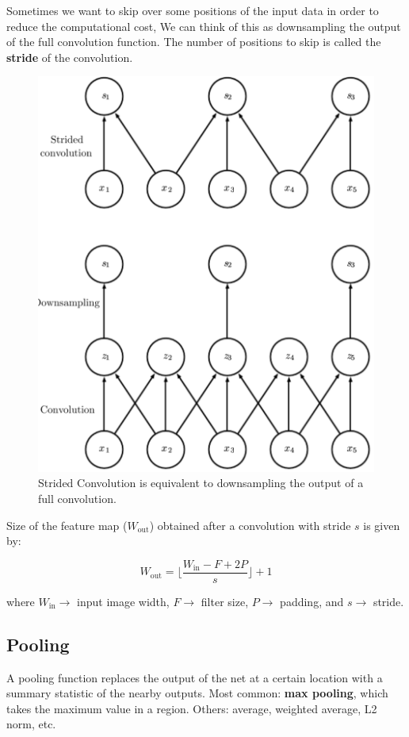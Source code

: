 Sometimes we want to skip over some positions of the input data in order to reduce the computational cost, We can think of this as downsampling the output of the full convolution function. The number of positions to skip is called the \textbf{stride} of the convolution.

\begin{figure}[H]
  \centering
  \includegraphics[width=0.8\linewidth]{images/strided_convolution.png}
  \caption{Strided Convolution is equivalent to downsampling the output of a full convolution.}
\end{figure}

Size of the feature map ($W_\text{out}$) obtained after a convolution with stride $s$ is given by:

\begin{equation*}
  W_\text{out} = \bigg\lfloor \frac{W_\text{in} - F + 2P}{s} \bigg\rfloor + 1
\end{equation*}

where $W_\text{in} \rightarrow$ input image width, $F \rightarrow$ filter size, $P \rightarrow$ padding, and $s \rightarrow$ stride.
\subsection*{Pooling}

A pooling function replaces the output of the net at a certain location with a summary statistic of the nearby outputs. Most common: \textbf{max pooling}, which takes the maximum value in a region. Others: average, weighted average, L2 norm, etc.

